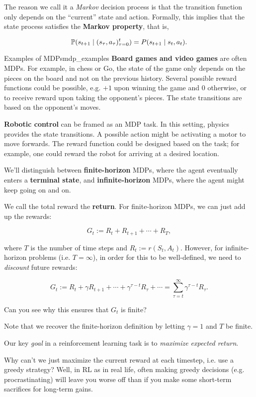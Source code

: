\documentclass[../main/main]{subfiles}
\begin{document}
The reason we call it a \emph{Markov} decision process is that the transition function only depends on the ``current'' state and action. Formally, this implies that the state process satisfies the \textbf{Markov property}, that is,

\[
    \P(s_{t+1} \mid (s_\tau, a_\tau)_{\tau=0}^t) = P(s_{t+1} \mid s_t, a_t).
\]

\begin{example}{Examples of MDPs}{mdp_examples}
    \textbf{Board games and video games} are often MDPs. For example, in chess or Go, the state of the game only depends on the pieces on the board and not on the previous history. Several possible reward functions could be possible, e.g. $+1$ upon winning the game and $0$ otherwise, or to receive reward upon taking the opponent's pieces. The state transitions are based on the opponent's moves.

    \textbf{Robotic control} can be framed as an MDP task. In this setting, physics provides the state transitions. A possible action might be activating a motor to move forwards. The reward function could be designed based on the task; for example, one could reward the robot for arriving at a desired location.
\end{example}

We'll distinguish between \textbf{finite-horizon} MDPs, where the agent eventually enters a \textbf{terminal state}, and \textbf{infinite-horizon} MDPs, where the agent might keep going on and on.

We call the total reward the \textbf{return}. For finite-horizon MDPs, we can just add up the rewards:

\[
    G_t := R_t + R_{t+1} + \cdots + R_T,
\]

where $T$ is the number of time steps and $R_t := r(S_t, A_t)$. However, for infinite-horizon problems (i.e. $T = \infty$), in order for this to be well-defined, we need to \emph{discount} future rewards:

\[
    G_t := R_t + \gamma R_{t+1} + \cdots + \gamma^{\tau-t} R_{\tau} + \cdots = \sum_{\tau = t}^\infty \gamma^{\tau-t} R_\tau.
\]

Can you see why this ensures that $G_t$ is finite?

Note that we recover the finite-horizon definition by letting $\gamma = 1$ and $T$ be finite.

Our key \emph{goal} in a reinforcement learning task is to \emph{maximize expected return}.

Why can't we just maximize the current reward at each timestep, i.e. use a greedy strategy? Well, in RL as in real life, often making greedy decisions (e.g. procrastinating) will leave you worse off than if you make some short-term sacrifices for long-term gains.
\end{document}
